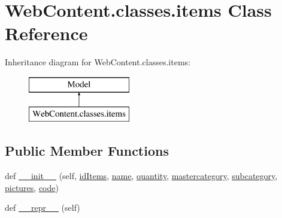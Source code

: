 \hypertarget{class_web_content_1_1classes_1_1items}{}\section{Web\+Content.\+classes.\+items Class Reference}
\label{class_web_content_1_1classes_1_1items}
Inheritance diagram for Web\+Content.\+classes.\+items\+:\begin{figure}[H]
\begin{center}
\leavevmode
\includegraphics[height=2.000000cm]{class_web_content_1_1classes_1_1items}
\end{center}
\end{figure}
\subsection*{Public Member Functions}
\begin{DoxyCompactItemize}
\item 
def \hyperlink{class_web_content_1_1classes_1_1items_a69e23b8eb679a8f5fe127d05368f146c}{\+\_\+\+\_\+init\+\_\+\+\_\+} (self, \hyperlink{class_web_content_1_1classes_1_1items_ae81c7aff4b6699e4b73fdc2c58e7c17f}{id\+Items}, \hyperlink{class_web_content_1_1classes_1_1items_a6b9cc2755a793d5710d6aaa583c64ed7}{name}, \hyperlink{class_web_content_1_1classes_1_1items_ad3adf84b02910cbad246217c240b9bc1}{quantity}, \hyperlink{class_web_content_1_1classes_1_1items_a921e7c462d24e352af1c6386e33d4a54}{mastercategory}, \hyperlink{class_web_content_1_1classes_1_1items_abf504f02bb8165be106746d68ea6500a}{subcategory}, \hyperlink{class_web_content_1_1classes_1_1items_a84d35b34ce8cd95db165e325ce94f043}{pictures}, \hyperlink{class_web_content_1_1classes_1_1items_a0b093c44310dcd97c97580ef744ab1cd}{code})
\item 
def \hyperlink{class_web_content_1_1classes_1_1items_af090fcd951f16fc9e653dd0ca161dbcb}{\+\_\+\+\_\+repr\+\_\+\+\_\+} (self)
\end{DoxyCompactItemize}
